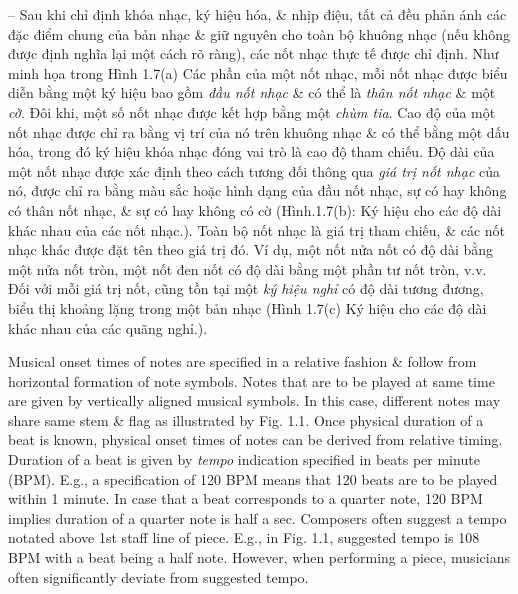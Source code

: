 \documentclass{article}
\begin{document}
\begin{itemize}
\begin{itemize}
\begin{itemize}
			-- Sau khi chỉ định khóa nhạc, ký hiệu hóa, \& nhịp điệu, tất cả đều phản ánh các đặc điểm chung của bản nhạc \& giữ nguyên cho toàn bộ khuông nhạc (nếu không được định nghĩa lại một cách rõ ràng), các nốt nhạc thực tế được chỉ định. Như minh họa trong {\sf Hình 1.7(a) Các phần của một nốt nhạc}, mỗi nốt nhạc được biểu diễn bằng một ký hiệu bao gồm {\it đầu nốt nhạc} \& có thể là {\it thân nốt nhạc} \& một {\it cờ}. Đôi khi, một số nốt nhạc được kết hợp bằng một {\it chùm tia}. Cao độ của một nốt nhạc được chỉ ra bằng vị trí của nó trên khuông nhạc \& có thể bằng một dấu hóa, trong đó ký hiệu khóa nhạc đóng vai trò là cao độ tham chiếu. Độ dài của một nốt nhạc được xác định theo cách tương đối thông qua {\it giá trị nốt nhạc} của nó, được chỉ ra bằng màu sắc hoặc hình dạng của đầu nốt nhạc, sự có hay không có thân nốt nhạc, \& sự có hay không có cờ ({\sf Hình.1.7(b): Ký hiệu cho các độ dài khác nhau của các nốt nhạc.}). Toàn bộ nốt nhạc là giá trị tham chiếu, \& các nốt nhạc khác được đặt tên theo giá trị đó. Ví dụ, một nốt nửa nốt có độ dài bằng một nửa nốt tròn, một nốt đen nốt có độ dài bằng một phần tư nốt tròn, v.v. Đối với mỗi giá trị nốt, cũng tồn tại một {\it ký hiệu nghỉ} có độ dài tương đương, biểu thị khoảng lặng trong một bản nhạc ({\sf Hình 1.7(c) Ký hiệu cho các độ dài khác nhau của các quãng nghỉ.}).
						
			Musical onset times of notes are specified in a relative fashion \& follow from horizontal formation of note symbols. Notes that are to be played at same time are given by vertically aligned musical symbols. In this case, different notes may share same stem \& flag as illustrated by {\sf Fig. 1.1}. Once physical duration of a beat is known, physical onset times of notes can be derived from relative timing. Duration of a beat is given by {\it tempo} indication specified in beats per minute (BPM). E.g., a specification of 120 BPM means that 120 beats are to be played within 1 minute. In case that a beat corresponds to a quarter note, 120 BPM implies duration of a quarter note is half a sec. Composers often suggest a tempo notated above 1st staff line of piece. E.g., in {\sf Fig. 1.1}, suggested tempo is 108 BPM with a beat being a half note. However, when performing a piece, musicians often significantly deviate from suggested tempo.
			

\end{itemize}
\end{itemize}
\end{itemize}
\end{document}
